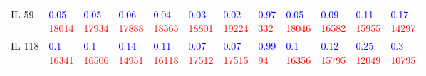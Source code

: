 \begin{tabular}{llllllllllll}
IL 59 & \makecell{\textcolor{blue}{0.05} \\ \textcolor{red}{18014}} & \makecell{\textcolor{blue}{0.05} \\ \textcolor{red}{17934}} & \makecell{\textcolor{blue}{0.06} \\ \textcolor{red}{17888}} & \makecell{\textcolor{blue}{0.04} \\ \textcolor{red}{18565}} & \makecell{\textcolor{blue}{0.03} \\ \textcolor{red}{18801}} & \makecell{\textcolor{blue}{0.02} \\ \textcolor{red}{19224}} & \makecell{\textcolor{blue}{0.97} \\ \textcolor{red}{332}} & \makecell{\textcolor{blue}{0.05} \\ \textcolor{red}{18046}} & \makecell{\textcolor{blue}{0.09} \\ \textcolor{red}{16582}} & \makecell{\textcolor{blue}{0.11} \\ \textcolor{red}{15955}} & \makecell{\textcolor{blue}{0.17} \\ \textcolor{red}{14297}} \\
IL 118 & \makecell{\textcolor{blue}{0.1} \\ \textcolor{red}{16341}} & \makecell{\textcolor{blue}{0.1} \\ \textcolor{red}{16506}} & \makecell{\textcolor{blue}{0.14} \\ \textcolor{red}{14951}} & \makecell{\textcolor{blue}{0.11} \\ \textcolor{red}{16118}} & \makecell{\textcolor{blue}{0.07} \\ \textcolor{red}{17512}} & \makecell{\textcolor{blue}{0.07} \\ \textcolor{red}{17515}} & \makecell{\textcolor{blue}{0.99} \\ \textcolor{red}{94}} & \makecell{\textcolor{blue}{0.1} \\ \textcolor{red}{16356}} & \makecell{\textcolor{blue}{0.12} \\ \textcolor{red}{15795}} & \makecell{\textcolor{blue}{0.25} \\ \textcolor{red}{12049}} & \makecell{\textcolor{blue}{0.3} \\ \textcolor{red}{10795}} \\

\end{tabular}
